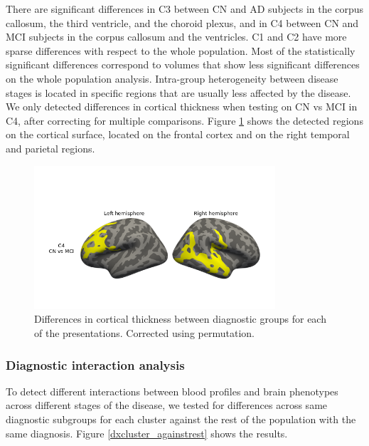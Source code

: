 There are significant differences in C3 between CN and AD subjects in the corpus callosum, the third ventricle, and the choroid plexus, and in C4 between CN and MCI subjects in the corpus callosum and the ventricles. C1 and C2 have more sparse differences with respect to the whole population. Most of the statistically significant differences correspond to volumes that show less significant differences on the whole population analysis. Intra-group heterogeneity between disease stages is located in specific regions that are usually less affected by the disease. \\

We only detected differences in cortical thickness when testing on CN vs MCI in C4, after correcting for multiple comparisons. Figure \ref{dx_subgroups_cort} shows the detected regions on the cortical surface, located on the frontal cortex and on the right temporal and parietal regions. \\

\begin{figure}[!htbp]
\centering
\includegraphics[width=0.8\textwidth]{figures/cimlr/ex2_C4_CN_MCI.png}
\caption[Diagnostic group analysis, cortical thickness.]{Differences in cortical thickness between diagnostic groups for each of the presentations. Corrected using permutation.}
\label{dx_subgroups_cort}
\end{figure}

\subsubsection{Diagnostic interaction analysis}

To detect different interactions between blood profiles and brain phenotypes across different stages of the disease, we tested for differences across same diagnostic subgroups for each cluster against the rest of the population with the same diagnosis. Figure \ref{dxcluster_againstrest} shows the results.

